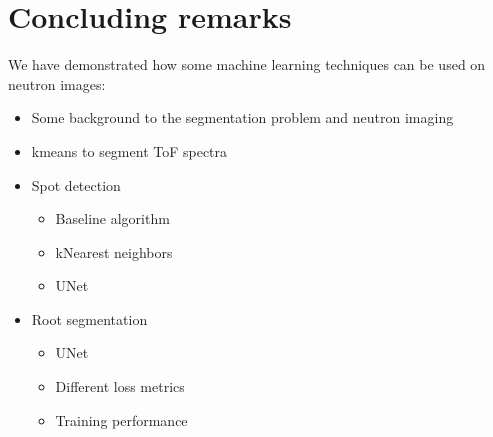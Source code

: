 \documentclass[letterpaper,10pt,english]{sphinxmanual}
\begin{document}
\chapter{Concluding remarks}
\label{\detokenize{ML4NeutronImageSegmentation:concluding-remarks}}
We have demonstrated how some machine learning techniques can be used on neutron images:
\begin{itemize}
\item {} 
Some background to the segmentation problem and neutron imaging

\item {} 
k\sphinxhyphen{}means \sphinxhyphen{} to segment ToF spectra

\item {} 
Spot detection
\begin{itemize}
\item {} 
Baseline algorithm

\item {} 
k\sphinxhyphen{}Nearest neighbors

\item {} 
U\sphinxhyphen{}Net

\end{itemize}

\item {} 
Root segmentation
\begin{itemize}
\item {} 
U\sphinxhyphen{}Net

\item {} 
Different loss metrics

\item {} 
Training performance

\end{itemize}

\end{itemize}







\renewcommand{\indexname}{Index}
\printindex
\end{document}
